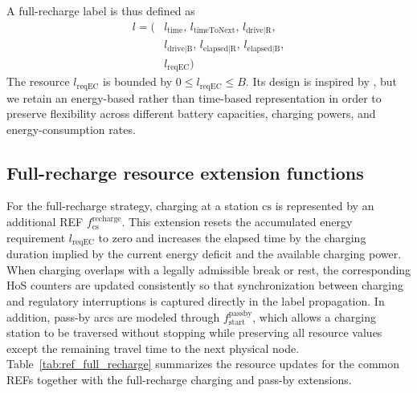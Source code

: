 \documentclass[3p,11pt,authoryear]{elsarticle}  %
\begin{document}
A full-recharge label is thus defined as
\[
\begin{aligned}
l = (&l_{\text{time}},\, l_{\text{timeToNext}},\, l_{\text{drive|R}},\\
     &l_{\text{drive|B}},\, l_{\text{elapsed|R}},\, l_{\text{elapsed|B}},\\
     &l_{\text{reqEC}})
\end{aligned}
\]
The resource \(l_{\text{reqEC}}\) is bounded by \(0 \leq l_{\text{reqEC}} \leq B\). Its design is inspired by \citet{desaulniers2016exact}, but we retain an energy-based rather than time-based representation in order to preserve flexibility across different battery capacities, charging powers, and energy-consumption rates.


\subsection{Full-recharge resource extension functions}


For the full-recharge strategy, charging at a station \(\mathrm{cs}\) is represented by an additional REF \(f^{\text{recharge}}_{\mathrm{cs}}\). This extension resets the accumulated energy requirement \(l_{\text{reqEC}}\) to zero and increases the elapsed time by the charging duration implied by the current energy deficit and the available charging power. When charging overlaps with a legally admissible break or rest, the corresponding HoS counters are updated consistently so that synchronization between charging and regulatory interruptions is captured directly in the label propagation. In addition, pass-by arcs are modeled through \(f^{\text{passby}}_{\text{start}}\), which allows a charging station to be traversed without stopping while preserving all resource values except the remaining travel time to the next physical node. Table~\ref{tab:ref_full_recharge} summarizes the resource updates for the common REFs together with the full-recharge charging and pass-by extensions.
\end{document}
